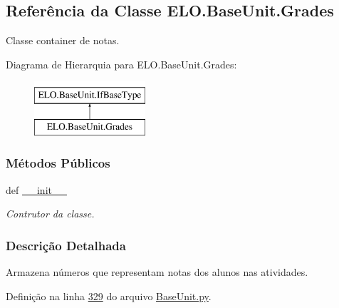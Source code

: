 \hypertarget{classELO_1_1BaseUnit_1_1Grades}{\subsection{Referência da Classe E\-L\-O.\-Base\-Unit.\-Grades}
\label{classELO_1_1BaseUnit_1_1Grades}
}


Classe container de notas.  


Diagrama de Hierarquia para E\-L\-O.\-Base\-Unit.\-Grades\-:\begin{figure}[H]
\begin{center}
\leavevmode
\includegraphics[height=2.000000cm]{dc/d3a/classELO_1_1BaseUnit_1_1Grades}
\end{center}
\end{figure}
\subsubsection*{Métodos Públicos}
\begin{DoxyCompactItemize}
\item 
def \hyperlink{classELO_1_1BaseUnit_1_1Grades_af948e06e9c08a7d99da82eae5f851839}{\-\_\-\-\_\-init\-\_\-\-\_\-}
\begin{DoxyCompactList}\small\item\em Contrutor da classe. \end{DoxyCompactList}\end{DoxyCompactItemize}


\subsubsection{Descrição Detalhada}
Armazena números que representam notas dos alunos nas atividades. 

Definição na linha \hyperlink{BaseUnit_8py_source_l00329}{329} do arquivo \hyperlink{BaseUnit_8py_source}{Base\-Unit.\-py}.




